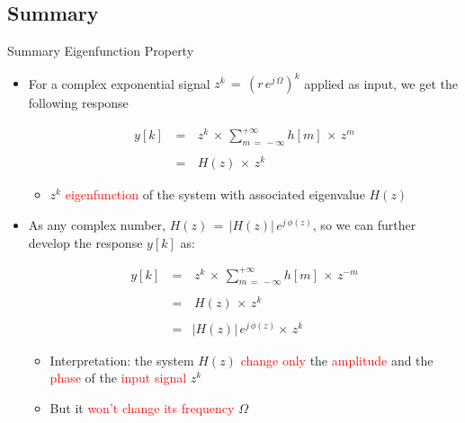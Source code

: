 \documentclass{beamer}
\begin{document}
\subsection{Summary}
\begin{frame}[t,allowframebreaks]{Summary Eigenfunction Property}

\begin{itemize}

\item For a complex exponential signal $z^k \, = \, (r \, e^{j \, \Omega})^k$ applied as input, we get the following response

\begin{equation}
\begin{array}{rcl}
y[k] \, &=& \, z^k \, \times \, \displaystyle\sum_{m \, = \, - \infty}^{+ \infty} h[m] \, \times \, z^m \\ \\
&=& \, H(z) \, \times \, z^k  
\end{array}
\end{equation}

	\begin{itemize}
	\item $z^k$ \textcolor{red}{eigenfunction} of the system with associated eigenvalue $H(z)$ 
	\end{itemize}


\item As any complex number, $H(z) \, = \, |H(z)| \, e^{j \, \phi(z)}$, so we can further develop the response $y[k]$ as:

\begin{equation}
\begin{array}{rcl}
y[k] \, &=& \, z^k \, \times \, \displaystyle\sum_{m \, = \, - \infty}^{+ \infty} h[m] \, \times \, z^{-m} \\ \\
&=& \, H(z) \, \times \, z^k \\ \\
&=& |H(z)| \, e^{j \, \phi(z)}   \times \, z^k 
\end{array}
\end{equation}

	\begin{itemize}
	\item Interpretation: the system $H(z)$ \textcolor{red}{change only} the \textcolor{red}{amplitude} and the \textcolor{red}{phase} of the \textcolor{red}{input signal} $z^k$
	
	\item But it \textcolor{red}{won't change its frequency} $\Omega$
	\end{itemize}

\end{itemize}


\end{frame}
\end{document}
